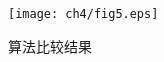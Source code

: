 \begin{figure}[!htbp]
\begin{center}
\texttt{[image: ch4/fig5.eps]}\\

\end{center}
\caption{算法比较结果}
\label{ch4:fig:result}       %
\end{figure}

